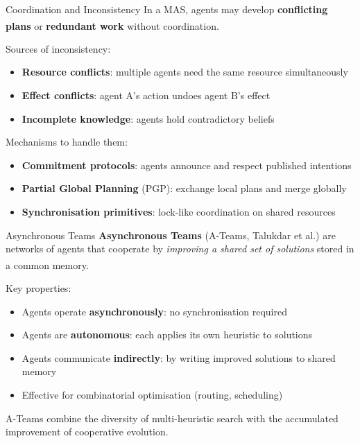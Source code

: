 \begin{v3topic}{Coordination and Inconsistency}
    In a MAS, agents may develop \textbf{conflicting plans} or
    \textbf{redundant work} without coordination.
    \textsuperscript{\cite[][p.~172]{wooldridgeIntroductionMultiAgentSystems2009}}

    Sources of inconsistency:
    \begin{itemize}
        \item \textbf{Resource conflicts}: multiple agents need the same resource simultaneously
        \item \textbf{Effect conflicts}: agent A's action undoes agent B's effect
        \item \textbf{Incomplete knowledge}: agents hold contradictory beliefs
    \end{itemize}
    Mechanisms to handle them:
    \begin{itemize}
        \item \textbf{Commitment protocols}: agents announce and respect published intentions
        \item \textbf{Partial Global Planning} (PGP): exchange local plans and merge globally
        \item \textbf{Synchronisation primitives}: lock-like coordination on shared resources
    \end{itemize}

\end{v3topic}
\begin{v3topic}{Asynchronous Teams}
    \textbf{Asynchronous Teams} (A-Teams, Talukdar et al.) are networks of agents
    that cooperate by \emph{improving a shared set of solutions} stored in a
    common memory.\textsuperscript{\cite{talukdarASYNCHRONOUSTEAMSCOOPERATION}}

    Key properties:
    \begin{itemize}
        \item Agents operate \textbf{asynchronously}: no synchronisation required
        \item Agents are \textbf{autonomous}: each applies its own heuristic to solutions
        \item Agents communicate \textbf{indirectly}: by writing improved solutions to shared memory
        \item Effective for combinatorial optimisation (routing, scheduling)
    \end{itemize}
    A-Teams combine the diversity of multi-heuristic search with the
    accumulated improvement of cooperative evolution.

\end{v3topic}


